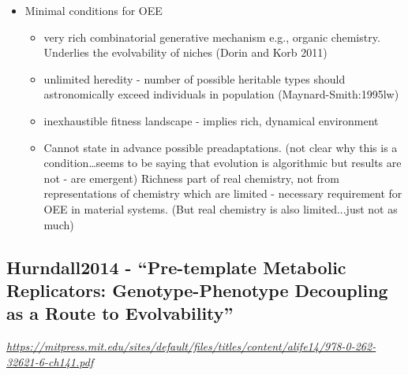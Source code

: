 \begin{itemize}
\begin{itemize}
			\end{itemize}
			\item
			
			Minimal conditions for OEE
			
			
			\begin{itemize}
				\item
				
				very rich combinatorial generative mechanism e.g., organic
				chemistry. Underlies the evolvability of niches (Dorin and Korb
				2011)
				
				\item
				
				unlimited heredity - number of possible heritable types should
				astronomically exceed individuals in population
				(Maynard-Smith:1995lw)
				
				\item
				
				inexhaustible fitness landscape - implies rich, dynamical
				environment
				
				\item
				
				Cannot state in advance possible preadaptations. (not clear why this
				is a condition\ldots{}seems to be saying that evolution is
				algorithmic but results are not - are emergent) Richness part of
				real chemistry, not from representations of chemistry which are
				limited - necessary requirement for OEE in material systems. (But
				real chemistry is also limited...just not as much)
				
			\end{itemize}
		\end{itemize}
		
		\hypertarget{hurndall2014---pre-template-metabolic-replicators-genotype-phenotype-decoupling-as-a-route-to-evolvability}{\subsection{Hurndall2014
				- ``Pre-template Metabolic Replicators: Genotype-Phenotype Decoupling as
				a Route to
				Evolvability''}\label{hurndall2014---pre-template-metabolic-replicators-genotype-phenotype-decoupling-as-a-route-to-evolvability}}
		
		\href{https://mitpress.mit.edu/sites/default/files/titles/content/alife14/978-0-262-32621-6-ch141.pdf}{\emph{https://mitpress.mit.edu/sites/default/files/titles/content/alife14/978-0-262-32621-6-ch141.pdf}}
		
